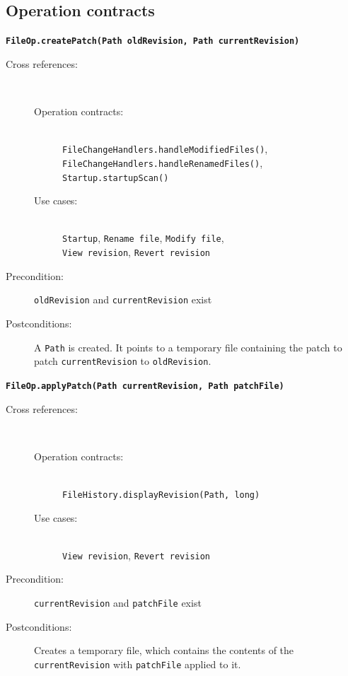 \documentclass[12pt,a4paper]{article}
\begin{document}
\subsection{Operation contracts}
\textbf{\texttt{FileOp.createPatch(Path oldRevision, Path currentRevision)}}
\begin{description} 
	\item[Cross references:] \hfill \vspace{-4ex} \\
		\begin{description}
		\item[Operation contracts:] \hfill \\
			\texttt{FileChangeHandlers.handleModifiedFiles()},\\
			\texttt{FileChangeHandlers.handleRenamedFiles()},\\
			\texttt{Startup.startupScan()}
		\item[Use cases:] \hfill \\
			\texttt{Startup}, \texttt{Rename file}, \texttt{Modify file},\\
			\texttt{View revision}, \texttt{Revert revision}
		\end{description}
	\item[Precondition:] \texttt{oldRevision} and \texttt{currentRevision} exist
	\item[Postconditions:] A \texttt{Path} is created. It points to a temporary file containing the patch to patch \texttt{currentRevision} to \texttt{oldRevision}.
\end{description}

\vspace{0.75cm}

\textbf{\texttt{FileOp.applyPatch(Path currentRevision, Path patchFile)}}
\begin{description}
	\item[Cross references:] \hfill \vspace{-4ex} \\
	\begin{description}
		\item[Operation contracts:] \hfill \\
			\texttt{FileHistory.displayRevision(Path, long)}
		\item[Use cases:] \hfill \\
			\texttt{View revision}, \texttt{Revert revision}
	\end{description}
	\item[Precondition:] \texttt{currentRevision} and \texttt{patchFile} exist
	\item[Postconditions:] Creates a temporary file, which contains the contents of the 		\texttt{currentRevision} with \texttt{patchFile} applied to it.
\end{description}
\end{document}
